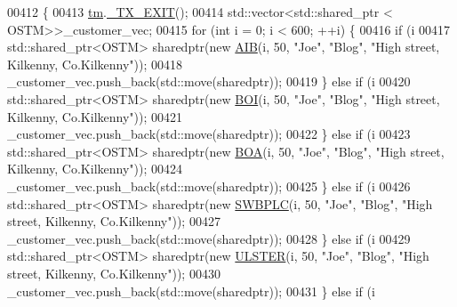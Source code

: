 \begin{DoxyCode}
00412                                                                \{
00413     \hyperlink{class_my_test_c_ase_a422e6e5d4ddedea384be96031c89b72b_a422e6e5d4ddedea384be96031c89b72b}{tm}.\hyperlink{class_t_m_a5e2d1127f2429f2f524d25f430eade06_a5e2d1127f2429f2f524d25f430eade06}{\_TX\_EXIT}();
00414      std::vector<std::shared\_ptr < OSTM>>\_customer\_vec; 
00415      \textcolor{keywordflow}{for} (\textcolor{keywordtype}{int} i = 0; i < 600; ++i) \{
00416         \textcolor{keywordflow}{if} (i %
00417             std::shared\_ptr<OSTM> sharedptr(\textcolor{keyword}{new} \hyperlink{class_a_i_b}{AIB}(i, 50, \textcolor{stringliteral}{"Joe"}, \textcolor{stringliteral}{"Blog"}, \textcolor{stringliteral}{"High street, Kilkenny,
       Co.Kilkenny"}));
00418             \_customer\_vec.push\_back(std::move(sharedptr));
00419         \} \textcolor{keywordflow}{else} \textcolor{keywordflow}{if} (i %
00420             std::shared\_ptr<OSTM> sharedptr(\textcolor{keyword}{new} \hyperlink{class_b_o_i}{BOI}(i, 50, \textcolor{stringliteral}{"Joe"}, \textcolor{stringliteral}{"Blog"}, \textcolor{stringliteral}{"High street, Kilkenny,
       Co.Kilkenny"}));
00421             \_customer\_vec.push\_back(std::move(sharedptr));
00422         \} \textcolor{keywordflow}{else} \textcolor{keywordflow}{if} (i %
00423             std::shared\_ptr<OSTM> sharedptr(\textcolor{keyword}{new} \hyperlink{class_b_o_a}{BOA}(i, 50, \textcolor{stringliteral}{"Joe"}, \textcolor{stringliteral}{"Blog"}, \textcolor{stringliteral}{"High street, Kilkenny,
       Co.Kilkenny"}));
00424             \_customer\_vec.push\_back(std::move(sharedptr));
00425         \} \textcolor{keywordflow}{else} \textcolor{keywordflow}{if} (i %
00426             std::shared\_ptr<OSTM> sharedptr(\textcolor{keyword}{new} \hyperlink{class_s_w_b_p_l_c}{SWBPLC}(i, 50, \textcolor{stringliteral}{"Joe"}, \textcolor{stringliteral}{"Blog"}, \textcolor{stringliteral}{"High street, Kilkenny,
       Co.Kilkenny"}));
00427             \_customer\_vec.push\_back(std::move(sharedptr));
00428         \} \textcolor{keywordflow}{else} \textcolor{keywordflow}{if} (i %
00429             std::shared\_ptr<OSTM> sharedptr(\textcolor{keyword}{new} \hyperlink{class_u_l_s_t_e_r}{ULSTER}(i, 50, \textcolor{stringliteral}{"Joe"}, \textcolor{stringliteral}{"Blog"}, \textcolor{stringliteral}{"High street, Kilkenny,
       Co.Kilkenny"}));
00430             \_customer\_vec.push\_back(std::move(sharedptr));
00431         \} \textcolor{keywordflow}{else} \textcolor{keywordflow}{if} (i %

\end{DoxyCode}
